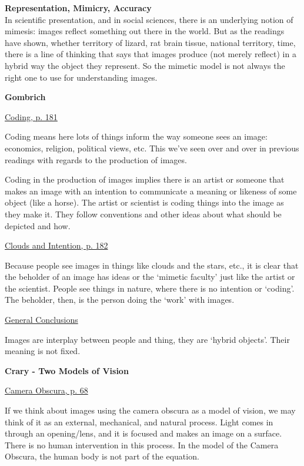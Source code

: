\documentclass[a4paper]{article}
\begin{document}
\medskip

\noindent\textbf{Representation, Mimicry, Accuracy}\\
In scientific presentation, and in social sciences, there is an underlying notion of mimesis: images reflect something out there in the world. But as the readings have shown, whether territory of lizard, rat brain tissue, national territory, time, there is a line of thinking that says that images produce (not merely reflect) in a hybrid way the object they represent. So the mimetic model is not always the right one to use for understanding images.

\medskip

\noindent\textbf{Gombrich}

\medskip
\noindent\underline{Coding, p. 181}

\medskip
\noindent Coding means here lots of things inform the way someone sees an image: economics, religion, political views, etc. This we've seen over and over in previous readings with regards to the production of images.

\medskip
\noindent Coding in the production of images implies there is an artist or someone that makes an image with an intention to communicate a meaning or likeness of some object (like a horse). The artist or scientist is coding things into the image as they make it. They follow conventions and other ideas about what should be depicted and how.

\medskip
\noindent\underline{Clouds and Intention, p. 182}

\medskip
\noindent Because people see images in things like clouds and the stars, etc., it is clear that the beholder of an image has ideas or the `mimetic faculty' just like the artist or the scientist. People see things in nature, where there is no intention or `coding'. The beholder, then, is the person doing the `work' with images.

\medskip
\noindent\underline{General Conclusions}

\medskip
\noindent Images are interplay between people and thing, they are `hybrid objects'. Their meaning is not fixed. 

\bigskip

\noindent\textbf{Crary - Two Models of Vision}

\medskip
\noindent\underline{Camera Obscura, p. 68}

\medskip
\noindent If we think about images using the camera obscura as a model of vision, we may think of it as an external, mechanical, and natural process. Light comes in through an opening/lens, and it is focused and makes an image on a surface. There is no human intervention in this process. In the model of the Camera Obscura, the human body is not part of the equation.
\end{document}
